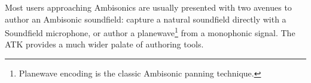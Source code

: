 \documentclass{article}
\begin{document}
%

Most users approaching Ambisonics are usually presented with two avenues to author an Ambisonic soundfield: capture a natural soundfield directly with a Soundfield microphone, or author a planewave\footnote{Planewave encoding is the classic 
Ambisonic panning technique.} from a monophonic signal.
The ATK provides a much wider palate of authoring tools.
\end{document}
